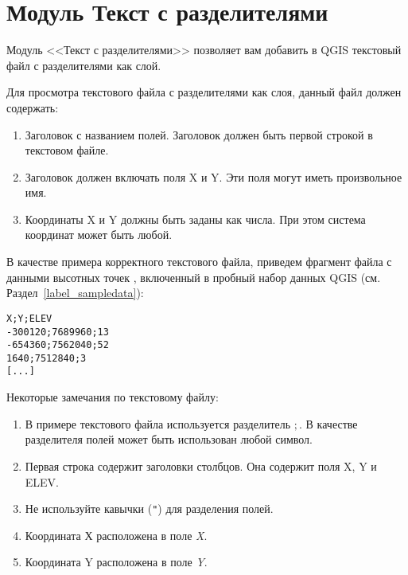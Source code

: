 
\section{Модуль Текст с разделителями}\label{label_dltext}


Модуль <<Текст с разделителями>> позволяет вам добавить в QGIS текстовый файл
с разделителями как слой.


Для просмотра текстового файла с разделителями как слоя, данный файл должен
содержать:

\begin{enumerate}
\item Заголовок с названием полей. Заголовок должен быть первой строкой
в текстовом файле.
\item Заголовок должен включать поля X и Y. Эти поля могут иметь произвольное имя.
\item Координаты X и Y должны быть заданы как числа. При этом система
координат может быть любой.
\end{enumerate}

В качестве примера корректного текстового файла, приведем фрагмент файла
с данными высотных точек , включенный в пробный набор
данных QGIS (см. Раздел~\ref{label_sampledata}):

\begin{verbatim}
X;Y;ELEV
-300120;7689960;13
-654360;7562040;52
1640;7512840;3
[...]
\end{verbatim}

Некоторые замечания по текстовому файлу:

\begin{enumerate}
\item В примере текстового файла используется разделитель \mbox{$;$}. В
качестве разделителя полей может быть использован любой символ.
\item Первая строка содержит заголовки столбцов. Она содержит поля X, Y и ELEV.
\item Не используйте кавычки ({\tt{}"{}}) для разделения полей.
\item Координата Х расположена в поле {\em X}.
\item Координата Y расположена в поле {\em Y}.
\end{enumerate}

